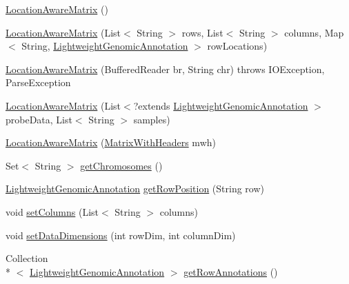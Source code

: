 \begin{DoxyCompactItemize}
\item 
\hyperlink{classbroad_1_1pda_1_1datastructures_1_1_location_aware_matrix_a3e8e0629a1ff4a820ec70d785151d65b}{Location\+Aware\+Matrix} ()
\item 
\hyperlink{classbroad_1_1pda_1_1datastructures_1_1_location_aware_matrix_ae157adefc31b8bc3ac12fea92636208d}{Location\+Aware\+Matrix} (List$<$ String $>$ rows, List$<$ String $>$ columns, Map$<$ String, \hyperlink{interfacebroad_1_1core_1_1annotation_1_1_lightweight_genomic_annotation}{Lightweight\+Genomic\+Annotation} $>$ row\+Locations)
\item 
\hyperlink{classbroad_1_1pda_1_1datastructures_1_1_location_aware_matrix_a8da59b87a189a698bdef33471b85d358}{Location\+Aware\+Matrix} (Buffered\+Reader br, String chr)  throws I\+O\+Exception, 			\+Parse\+Exception 
\item 
\hyperlink{classbroad_1_1pda_1_1datastructures_1_1_location_aware_matrix_a0b4e64d0423afbabaf12ee4f81b3b9cc}{Location\+Aware\+Matrix} (List$<$?extends \hyperlink{interfacebroad_1_1core_1_1annotation_1_1_lightweight_genomic_annotation}{Lightweight\+Genomic\+Annotation} $>$ probe\+Data, List$<$ String $>$ samples)
\item 
\hyperlink{classbroad_1_1pda_1_1datastructures_1_1_location_aware_matrix_a3917bb578d512f2e05b1c57cab4a2ab6}{Location\+Aware\+Matrix} (\hyperlink{classbroad_1_1core_1_1datastructures_1_1_matrix_with_headers}{Matrix\+With\+Headers} mwh)
\item 
Set$<$ String $>$ \hyperlink{classbroad_1_1pda_1_1datastructures_1_1_location_aware_matrix_a2e1340ec85a65aa076a4f1deacd9c049}{get\+Chromosomes} ()
\item 
\hyperlink{interfacebroad_1_1core_1_1annotation_1_1_lightweight_genomic_annotation}{Lightweight\+Genomic\+Annotation} \hyperlink{classbroad_1_1pda_1_1datastructures_1_1_location_aware_matrix_affcb1adcdf0e72debfeb7ac5c3da1290}{get\+Row\+Position} (String row)
\item 
void \hyperlink{classbroad_1_1pda_1_1datastructures_1_1_location_aware_matrix_ae1ebf162e0ebbc8e9e3aae5b44db7596}{set\+Columns} (List$<$ String $>$ columns)
\item 
void \hyperlink{classbroad_1_1pda_1_1datastructures_1_1_location_aware_matrix_ad67e04f012ae218f9b8841144dd6a186}{set\+Data\+Dimensions} (int row\+Dim, int column\+Dim)
\item 
Collection\\*
$<$ \hyperlink{interfacebroad_1_1core_1_1annotation_1_1_lightweight_genomic_annotation}{Lightweight\+Genomic\+Annotation} $>$ \hyperlink{classbroad_1_1pda_1_1datastructures_1_1_location_aware_matrix_a67a96cdf0a6b10a54641fd63d1974f96}{get\+Row\+Annotations} ()

\end{DoxyCompactItemize}
